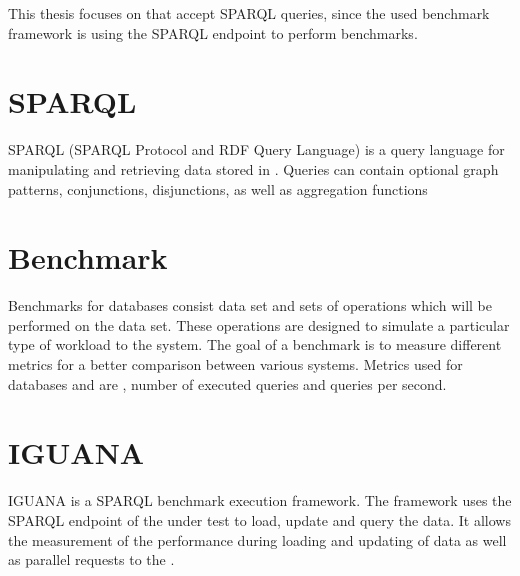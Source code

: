This thesis focuses on \tsp{} that accept SPARQL queries, since the used benchmark framework \iguana{} is using the SPARQL endpoint to perform benchmarks\cite{conradsIguanaGenericFramework2017}.


\section{SPARQL}
\label{sec:sparql}
SPARQL (SPARQL Protocol and RDF Query Language)\cite{harrisSPARQLQueryLanguage} is a query language for manipulating and retrieving data stored in \tsp{}.
Queries can contain optional graph patterns, conjunctions, disjunctions, as well as aggregation functions


\section{Benchmark}
\label{sec:benchmark}
Benchmarks for databases consist data set and sets of operations which will be performed on the data set.
These operations are designed to simulate a particular type of workload to the system.
The goal of a benchmark is to measure different metrics for a better comparison between various systems.
Metrics used for databases and \tsp{} are \eg, number of executed queries and queries per second\cite{MetricsIguanaDocumentation}.



\section{IGUANA}
\label{sec:iguana}
IGUANA is a SPARQL benchmark execution framework\cite{conradsIguanaGenericFramework2017}.
The framework uses the SPARQL endpoint of the \ts{} under test to load, update and query the data.
It allows the measurement of the performance during loading and updating of data as well as parallel requests to the \ts{}.
























